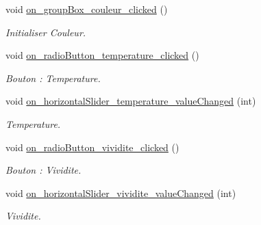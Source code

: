 \begin{DoxyCompactItemize}
\mbox{\label{classMainWindow_a4d9bf83c8cffaac0b6feda0e00dd76f0}} 
void \hyperlink{classMainWindow_a4d9bf83c8cffaac0b6feda0e00dd76f0}{on\+\_\+group\+Box\+\_\+couleur\+\_\+clicked} ()
\begin{DoxyCompactList}\small\item\em Initialiser Couleur. \end{DoxyCompactList}\item 
\mbox{\label{classMainWindow_ae176e250dbd50fcabf40064101a90987}} 
void \hyperlink{classMainWindow_ae176e250dbd50fcabf40064101a90987}{on\+\_\+radio\+Button\+\_\+temperature\+\_\+clicked} ()
\begin{DoxyCompactList}\small\item\em Bouton \+: Temperature. \end{DoxyCompactList}\item 
\mbox{\label{classMainWindow_ac45ec92e372ec2a02d5c69a8b6fb80e9}} 
void \hyperlink{classMainWindow_ac45ec92e372ec2a02d5c69a8b6fb80e9}{on\+\_\+horizontal\+Slider\+\_\+temperature\+\_\+value\+Changed} (int)
\begin{DoxyCompactList}\small\item\em Temperature. \end{DoxyCompactList}\item 
\mbox{\label{classMainWindow_a56fc0fe0a0c6150aef0d877f219d666d}} 
void \hyperlink{classMainWindow_a56fc0fe0a0c6150aef0d877f219d666d}{on\+\_\+radio\+Button\+\_\+vividite\+\_\+clicked} ()
\begin{DoxyCompactList}\small\item\em Bouton \+: Vividite. \end{DoxyCompactList}\item 
\mbox{\label{classMainWindow_a20985e6c681639b6a4a48f35837a7e59}} 
void \hyperlink{classMainWindow_a20985e6c681639b6a4a48f35837a7e59}{on\+\_\+horizontal\+Slider\+\_\+vividite\+\_\+value\+Changed} (int)
\begin{DoxyCompactList}\small\item\em Vividite. \end{DoxyCompactList}\item 
\mbox{\label{classMainWindow_a313f05860248e6079a494d57308c17f7}} 

\end{DoxyCompactItemize}
